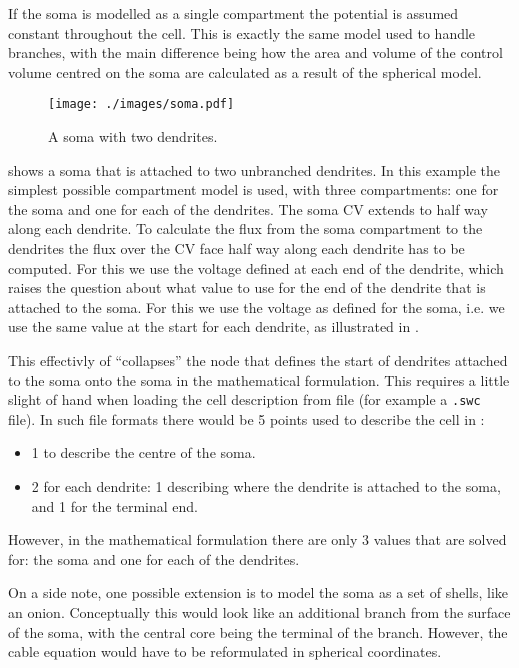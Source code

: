 If the soma is modelled as a single compartment the potential is assumed constant throughout the cell.
This is exactly the same model used to handle branches, with the main difference being how the area and volume of the control volume centred on the soma are calculated as a result of the spherical model.

\begin{figure}
    \begin{center}
        \texttt{[image: ./images/soma.pdf]}
    \end{center}
    \caption{A soma with two dendrites.}
    \label{fig:soma}
\end{figure}

 shows a soma that is attached to two unbranched dendrites.
In this example the simplest possible compartment model is used, with three compartments: one for the soma and one for each of the dendrites.
The soma CV extends to half way along each dendrite.
To calculate the flux from the soma compartment to the dendrites the flux over the CV face half way along each dendrite has to be computed.
For this we use the voltage defined at each end of the dendrite, which raises the question about what value to use for the end of the dendrite that is attached to the soma.
For this we use the voltage as defined for the soma, i.e. we use the same value at the start for each dendrite, as illustrated in .

This effectivly of ``collapses'' the node that defines the start of dendrites attached to the soma onto the soma in the mathematical formulation.
This requires a little slight of hand when loading the cell description from file (for example a \verb!.swc! file).
In such file formats there would be 5 points used to describe the cell in :
\begin{itemize}
    \item 1 to describe the centre of the soma.
    \item 2 for each dendrite: 1 describing where the dendrite is attached to the soma, and 1 for the terminal end.
\end{itemize}
However, in the mathematical formulation there are only 3 values that are solved for: the soma and one for each of the dendrites.

On a side note, one possible extension is to model the soma as a set of shells, like an onion.
Conceptually this would look like an additional branch from the surface of the soma, with the central core being the terminal of the branch.
However, the cable equation would have to be reformulated in spherical coordinates.


